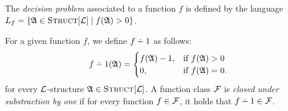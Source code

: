 \documentclass[12pt]{article}
\def\dotminus{\mathbin{\ooalign{\hss\raise1ex\hbox{.}\hss\cr
  \mathsurround=0pt$-$}}}
\def\Truc{\textsc{Struct}[\L]}
\def\A{{\frak A}}
\def\F{{\cal F}}
\def\L{{\cal L}}
\begin{document}
The {\em decision problem} associated to a function $f$ is defined by the language $L_f = \{\A \in \Truc \mid f(\A) > 0\}$.







For a given function $f$, we define $f \dotminus 1$ as follows:
\begin{eqnarray*}
f \dotminus 1(\A) =
\begin{cases}
f(\A)-1, & \text{if }f(\A) > 0 \\
0, & \text{if }f(\A) = 0.
\end{cases}
\end{eqnarray*}
for every $\L$-structure $\A \in \Truc$. A function class $\F$ is {\em closed under substraction by one} if for every function $f \in \F$, it holds that $f \dotminus 1 \in \F$.


\end{document}
